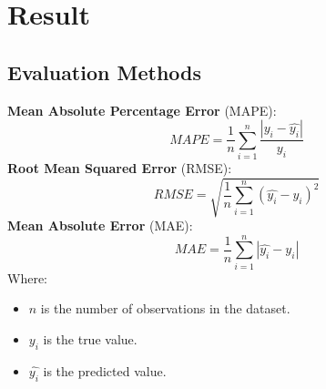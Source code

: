 \documentclass{ieeeojies}
\begin{document}
\section{Result}

\subsection{Evaluation Methods}
    \textbf{Mean Absolute Percentage Error} (MAPE):
        \[MAPE = \frac{1}{n} \sum_{i=1}^{n} \frac{\left| y_i - \hat{y_i} \right|}{y_i}\]
    \textbf{Root Mean Squared Error} (RMSE):
        \[RMSE = \sqrt{\frac{1}{n} \sum_{i=1}^{n} (\hat{y_i} - y_i)^2}\]
    \textbf{Mean Absolute Error} (MAE):
        \[MAE = \frac{1}{n} \sum_{i=1}^{n} \left| \hat{y_i} - y_i \right|\]
    Where:
    \begin{itemize}
        \item $n$ is the number of observations in the dataset.
        \item $y_i$ is the true value.
        \item $\hat{y_i}$ is the predicted value.
    \end{itemize}
    
\end{document}

